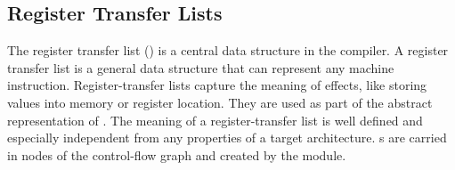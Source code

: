 \documentclass{article}%
\begin{document}
\subsection{Register Transfer Lists}

The register transfer list (\rtl) is a central data structure in the
compiler. A register transfer list is a general data structure that can
represent any machine instruction. Register-transfer lists capture the
meaning of effects, like storing values into memory or register
location.  They are used as part of the abstract representation of
{\PAL}.  The meaning of a register-transfer list is well defined and
especially independent from any properties of a target architecture.
{\rtl}s are carried in nodes of the control-flow graph and created by
the  module.
\end{document}
